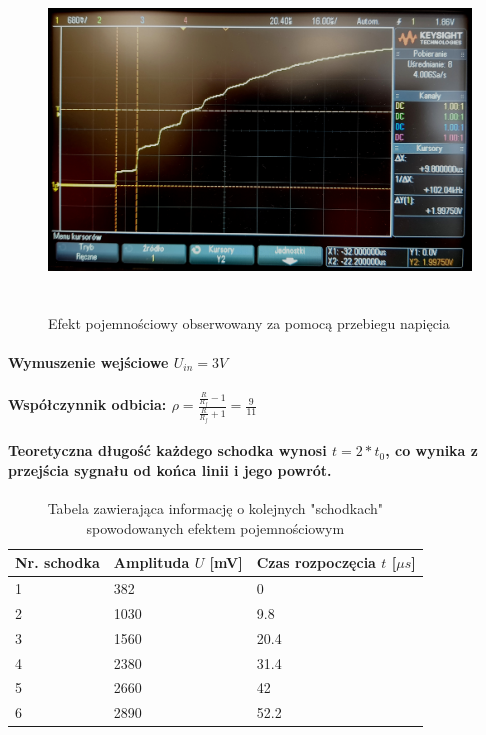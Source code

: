 \documentclass[a4paper,12pt]{article}
\begin{document}
\begin{justify}
\begin{figure}[h]
\centering
\includegraphics[width=15cm, height=9cm]{2_c}
\caption{Efekt pojemnościowy obserwowany za pomocą przebiegu napięcia}
\end{figure}

\paragraph{Wymuszenie wejściowe $U_{in} = 3V$}
\paragraph{Współczynnik odbicia: $\rho = \frac{\frac{R}{R_{f}} -1}{\frac{R}{R_{f}} +1} = \frac{9}{11}$}

\paragraph{Teoretyczna długość każdego schodka wynosi $t = 2 * t_{0}$, co wynika z przejścia sygnału od końca linii i jego powrót.}

\newpage

\begin{table}[h!]
\begin{center}
\begin{scriptsize}
\begin{tabular}{|l|l|l|}
\hline
Nr. schodka & Amplituda $U$ [mV] & Czas rozpoczęcia $t$ [$\mu s$] \\
\hline
1 & 382 & 0 \\
2 & 1030 & 9.8 \\
3 & 1560 & 20.4 \\
4 & 2380 & 31.4 \\
5 & 2660 & 42 \\
6 & 2890 & 52.2 \\
\hline
\end{tabular}
\caption{Tabela zawierająca informację o kolejnych "schodkach" spowodowanych efektem pojemnościowym}
\label{table:1}
\end{scriptsize}
\end{center}
\end{table}


\end{justify}
\end{document}
